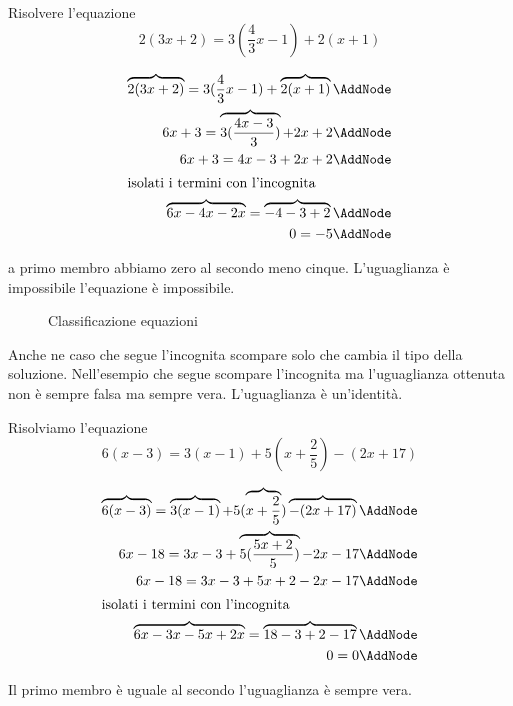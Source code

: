 \begin{esempiot}{}{}
Risolvere l'equazione \[2(3x+2)=3(\dfrac{4}{3}x-1)+2(x+1) \]
\end{esempiot}
 \begin{NodesList}[margin=3cm]
  \begin{align*}
\overbrace{2(3x+2)}=3(\dfrac{4}{3}x-1)+\overbrace{2(x+1)} \AddNode\\
6x+3=\overbrace{3(\dfrac{4x-3}{3})}+2x+2 \AddNode\\
 6x+3=4x-3+2x+2  \AddNode\\
  \intertext{\hfil isolati i termini con l'incognita \hfil}
 \overbrace{6x-4x-2x}=\overbrace{-4-3+2}  \AddNode\\
 0=-5\AddNode
  \end{align*}
  \end{NodesList}
  a  primo membro abbiamo zero al secondo meno cinque. L'uguaglianza è impossibile l'equazione è impossibile.
\begin{figure}
	\centering
	
	\caption[]{Classificazione equazioni}
	\label{fig:AlberoBinarioeqa1}
\end{figure}

Anche ne caso che segue l'incognita scompare solo che cambia il tipo della soluzione. Nell'esempio che segue scompare l'incognita ma l'uguaglianza ottenuta non è sempre falsa ma sempre vera. L'uguaglianza è un'identità.
\begin{esempiot}{}{}
Risolviamo l'equazione \[ 6(x-3) = 3(x-1)+5(x+\dfrac{2}{5})-(2x+17)\]
\end{esempiot}
\begin{NodesList}[margin=3cm]
  \begin{align*}
\overbrace{6(x-3)} = \overbrace{3(x-1)}+5(\overbrace{x+\dfrac{2}{5}})\overbrace{-(2x+17)} \AddNode\\
6x-18 = 3x-3+\overbrace{5(\dfrac{5x+2}{5})}-2x-17\AddNode\\
6x-18 = 3x-3+5x+2-2x-17  \AddNode\\
  \intertext{\hfil isolati i termini con l'incognita \hfil}
 \overbrace{6x-3x-5x+2x}=\overbrace{18-3+2-17}  \AddNode\\
 0=0\AddNode
  \end{align*}
  \end{NodesList}
  Il primo membro è uguale al secondo l'uguaglianza è sempre vera. 







